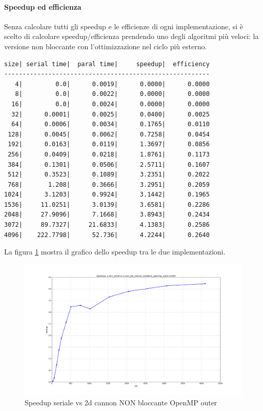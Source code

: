 \paragraph{Speedup ed efficienza}

Senza calcolare tutti gli speedup e le efficienze di ogni implementazione, si \`{e} scelto di calcolare speedup/efficienza prendendo uno degli algoritmi pi\`{u} veloci: la versione non bloccante con l'ottimizzazione nel ciclo pi\`{u} esterno.

\begin{lstlisting}
size| serial time|  paral time|     speedup|  efficiency
--------------------------------------------------------
   4|         0.0|      0.0019|      0.0000|      0.0000
   8|         0.0|      0.0022|      0.0000|      0.0000
  16|         0.0|      0.0024|      0.0000|      0.0000
  32|      0.0001|      0.0025|      0.0400|      0.0025
  64|      0.0006|      0.0034|      0.1765|      0.0110
 128|      0.0045|      0.0062|      0.7258|      0.0454
 192|      0.0163|      0.0119|      1.3697|      0.0856
 256|      0.0409|      0.0218|      1.8761|      0.1173
 384|      0.1301|      0.0506|      2.5711|      0.1607
 512|      0.3523|      0.1089|      3.2351|      0.2022
 768|       1.208|      0.3666|      3.2951|      0.2059
1024|      3.1203|      0.9924|      3.1442|      0.1965
1536|     11.0251|      3.0139|      3.6581|      0.2286
2048|     27.9096|      7.1668|      3.8943|      0.2434
3072|     89.7327|     21.6833|      4.1383|      0.2586
4096|    222.7798|      52.736|      4.2244|      0.2640
\end{lstlisting}

La figura \ref{fig:speedup_serial_2d_cannon_openmp_outer} mostra il grafico dello speedup tra le due implementazioni.

\begin{figure}[htbp]
    \begin{center}
        \includegraphics[width=15cm]{immagini/speedup_serial_2d_cannon_openmp_outer.png}
    \end{center}
    \caption{Speedup seriale vs 2d cannon NON bloccante OpenMP outer}
    \label{fig:speedup_serial_2d_cannon_openmp_outer}
\end{figure}

